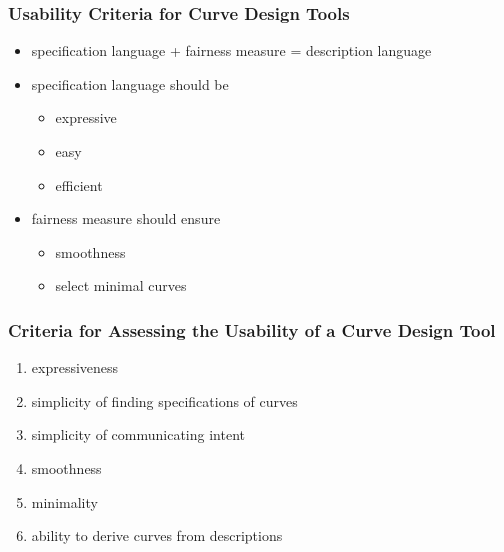 \documentclass{beamer}
\begin{document}
		\begin{frame}
			\frametitle{Usability Criteria for Curve Design Tools}
			\begin{itemize}
				\item specification language + fairness measure = description language
				\item specification language should be
				\begin{itemize}
					\item expressive
					\item easy
					\item efficient
				\end{itemize}
				\item fairness measure should ensure
				\begin{itemize}
					\item smoothness
					\item select minimal curves
				\end{itemize}
			\end{itemize}
		\end{frame}
		
		\begin{frame}
			\frametitle{Criteria for Assessing the Usability of a Curve Design Tool}
			\begin{enumerate}
				\item expressiveness
				\item simplicity of finding specifications of curves
				\item simplicity of communicating intent
				\item smoothness
				\item minimality
				\item ability to derive curves from descriptions
			\end{enumerate}
		\end{frame}
		
\end{document}
